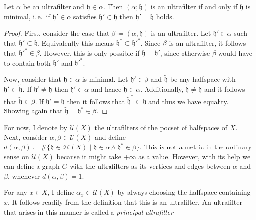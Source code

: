 \begin{lemma}
  Let \(\alpha\) be an ultrafilter and \(\mathfrak{h} \in \alpha\). Then \((\alpha;\mathfrak{h})\) is an ultrafilter if and only if \(\mathfrak{h}\) is minimal, i.\,e.\ if \(\mathfrak{h}' \in \alpha\) satisfies \(\mathfrak{h'} \subset \mathfrak{h}\) then \(\mathfrak{h'} = \mathfrak{h}\) holds.
\end{lemma}

\begin{proof}
  First, consider the case that \(\beta \coloneqq (\alpha, \mathfrak{h})\) is an ultrafilter. Let \(\mathfrak{h}' \in \alpha\) such that \(\mathfrak{h}' \subset \mathfrak{h}\). Equivalently this means \(\mathfrak{h}^\ast \subset \mathfrak{h}'^\ast\). Since \(\beta\) is an ultrafilter, it follows that \(\mathfrak{h}'^\ast \in \beta\). However, this is only possible if \(\mathfrak{h} = \mathfrak{h}'\), since otherwise \(\beta\) would have to contain both \(\mathfrak{h}' \) and \(\mathfrak{h}'^\ast\).

  Now, consider that \(\mathfrak{h} \in \alpha\) is minimal. Let \(\mathfrak{h}' \in \beta\) and \(\mathfrak{\tilde h}\) be any halfspace with \(\mathfrak{h}' \subset \mathfrak{\tilde h}\). If \(\mathfrak{h}' \neq \mathfrak{h}\) then \(\mathfrak{h}' \in \alpha \) and hence \(\mathfrak{\tilde h} \in \alpha\). Additionally, \(\mathfrak{\tilde h} \neq \mathfrak{h}\) and it follows that \(\mathfrak{\tilde h} \in \beta\). If \(\mathfrak{h}' = \mathfrak{h}\) then it follows that \(\mathfrak{\tilde h}^\ast \subset \mathfrak{h}\) and thus we have equality. Showing again that \(\mathfrak{\tilde h} = \mathfrak{h}^\ast \in \beta\).
\end{proof}

For now, I denote by \(\mathcal{U}(X)\) the ultrafilters of the pocset of halfspaces of \(X\). Next, consider \(\alpha, \beta \in \mathcal{U}(X)\) and define \(d(\alpha, \beta) \coloneqq \# \{ \mathfrak{h} \in \mathcal{H}(X)\mid \mathfrak{h} \in \alpha \wedge \mathfrak{h}^\ast \in \beta\}\). This is not a metric in the ordinary sense on \(\mathcal{U}(X)\) because it might take \(+\infty\) as a value. However, with its help we can define a graph \(G\) with the ultrafilters as its vertices and edges between \(\alpha\) and \(\beta\), whenever \(d(\alpha, \beta) = 1\).

\begin{defin}
  For any \(x \in X\), I define \(\alpha_x \in \mathcal{U}(X)\) by always choosing the halfspace containing \(x\). It follows readily from the definition that this is an ultrafilter. An ultrafilter that arises in this manner is called a \emph{principal ultrafilter}
\end{defin}

